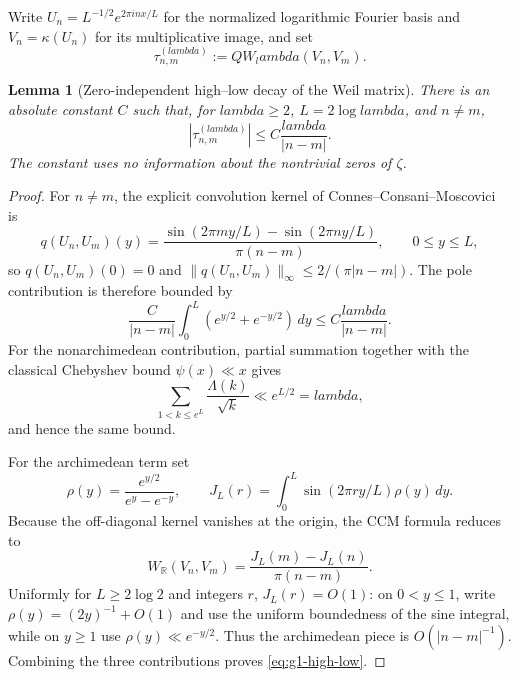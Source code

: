 \documentclass[11pt]{article}
\def\lambda{lambda}%
\newtheorem{lemma}[theorem]{Lemma}
\theoremstyle{remark}
\begin{document}
Write $U_n=L^{-1/2}e^{2\pi inx/L}$ for the normalized logarithmic Fourier basis and $V_n=\kappa(U_n)$ for its multiplicative image, and set
\[
 \tau^{(\lambda)}_{n,m}:=QW_\lambda(V_n,V_m).
\]

\begin{lemma}[Zero-independent high--low decay of the Weil matrix]\label{lem:g1-high-low}
There is an absolute constant $C$ such that, for $\lambda\ge2$,
$L=2\log\lambda$, and $n\ne m$,
\begin{equation}\label{eq:g1-high-low}
 \boxed{
 |\tau^{(\lambda)}_{n,m}|
 \le C\frac{\lambda}{|n-m|}.}
\end{equation}
The constant uses no information about the nontrivial zeros of $\zeta$.
\end{lemma}
\begin{proof}
For $n\ne m$, the explicit convolution kernel of
Connes--Consani--Moscovici~\cite{ConnesConsaniMoscovici2025} is
\[
 q(U_n,U_m)(y)
 =\frac{\sin(2\pi my/L)-\sin(2\pi ny/L)}{\pi(n-m)},
 \qquad 0\le y\le L,
\]
so $q(U_n,U_m)(0)=0$ and
$\|q(U_n,U_m)\|_\infty\le 2/(\pi|n-m|)$.  The pole contribution is therefore
bounded by
\[
 \frac{C}{|n-m|}\int_0^L(e^{y/2}+e^{-y/2})\,dy
 \le C\frac{\lambda}{|n-m|}.
\]
For the nonarchimedean contribution, partial summation together with the
classical Chebyshev bound $\psi(x)\ll x$ gives
\[
 \sum_{1<k\le e^L}\frac{\Lambda(k)}{\sqrt{k}}
 \ll e^{L/2}=\lambda,
\]
and hence the same bound.

For the archimedean term set
\[
 \rho(y)=\frac{e^{y/2}}{e^y-e^{-y}},\qquad
 J_L(r)=\int_0^L\sin(2\pi r y/L)\rho(y)\,dy.
\]
Because the off-diagonal kernel vanishes at the origin, the CCM formula reduces
to
\[
 W_{\mathbb R}(V_n,V_m)
 =\frac{J_L(m)-J_L(n)}{\pi(n-m)}.
\]
Uniformly for $L\ge2\log2$ and integers $r$, $J_L(r)=O(1)$: on $0<y\le1$,
write $\rho(y)=(2y)^{-1}+O(1)$ and use the uniform boundedness of the sine
integral, while on $y\ge1$ use $\rho(y)\ll e^{-y/2}$.  Thus the archimedean
piece is $O(|n-m|^{-1})$.  Combining the three contributions proves
\eqref{eq:g1-high-low}.
\end{proof}
\end{document}
